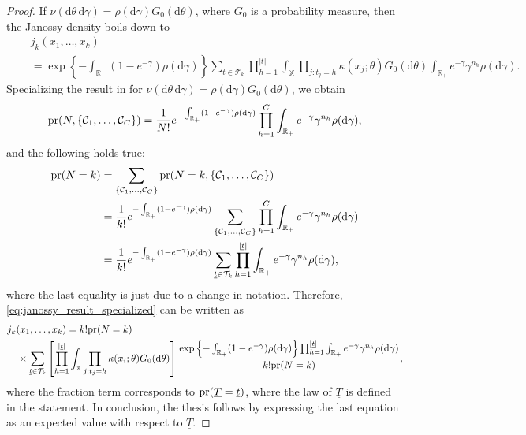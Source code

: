\documentclass[11pt,a4paper,oneside]{article}
\newcommand{\calC}{\mathcal{C}}
\newcommand{\calT}{\mathcal{T}}
\newcommand{\dd}{\mathrm d}
\newcommand{\X}{\mathbb{X}}
\newcommand{\R}{\mathbb{R}}
\newcommand{\prob}{{\rm pr}}
\theoremstyle{definition}
\theoremstyle{remark}
\begin{document}
\begin{proof}
If $\nu(\dd \theta\, \dd \gamma) = \rho(\dd \gamma) G_0(\dd \theta)$, where $G_0$ is a probability measure, then the Janossy density boils down to
\begin{equation}\label{eq:janossy_result_specialized}
\begin{split}
 & j_k(x_1,\ldots,x_k) \\
 \quad & = \exp\left\{ - \int_{\R_+} ( 1 - e^{-\gamma}) \rho(\dd \gamma) \right\} \sum_{\underline{t} \in \calT_k} \prod_{h=1}^{|\underline{t}|} \int_{\X} \prod_{j: t_j = h} \kappa(x_j ; \theta) G_0(\dd \theta) \int_{\R_+} e^{-\gamma} \gamma^{n_h} \rho(\dd \gamma).  
\end{split}
\end{equation}
Specializing the result in  for $\nu(\dd \theta\, \dd \gamma) = \rho(\dd \gamma) G_0(\dd \theta) $, we obtain
\[
\prob(N, \{\calC_1,\ldots, \calC_C\}) = \frac{1}{N!} e^{- \int_{\R_+}(1-e^{-\gamma}) \rho(\dd \gamma)} \prod_{h = 1}^C \int_{\R_+} e^{-\gamma} \gamma^{n_h} \rho(\dd \gamma), 
\]
and the following holds true:
\begin{equation*}
\begin{aligned}
    \prob(N = k) &= \sum_{\{\calC_1,\ldots,\calC_C\}} \prob(N = k, \{\calC_1,\ldots, \calC_C\})\\
    &= \frac{1}{k!} e^{- \int_{\R_+}(1-e^{-\gamma}) \rho(\dd \gamma)} \sum_{\{\calC_1,\ldots,\calC_C\}} \prod_{h = 1}^C \int_{\R_+} e^{-\gamma} \gamma^{n_h} \rho(\dd \gamma)\\
    &= \frac{1}{k!} e^{- \int_{\R_+}(1-e^{-\gamma}) \rho(\dd \gamma)} \sum_{\underline{t} \in \calT_k} \prod_{h = 1}^{|\underline{t}|} \int_{\R_+} e^{-\gamma} \gamma^{n_h} \rho(\dd \gamma),
\end{aligned}
\end{equation*}
where the last equality is just due to a change in notation. Therefore, \eqref{eq:janossy_result_specialized} can be written as
\begin{equation*}
\begin{aligned}
 &  j_k(x_1,\ldots,x_k) =  k!\prob(N=k) \\
    &\quad \times \sum_{\underline{t} \in \calT_k} \left[ \prod_{h=1}^{|\underline{t}|} \int_{\X} \prod_{j: t_j = h} \kappa(x_i ; \theta) G_0(\dd \theta)\right] \frac{\exp\left\{ - \int_{\R_+} ( 1 - e^{-\gamma}) \rho(\dd \gamma) \right\} \prod_{h=1}^{|\underline{t}|}  \int_{\R_+} e^{-\gamma} \gamma^{n_h} \rho(\dd \gamma)}{k!\prob(N=k)},  
\end{aligned}
\end{equation*}
where the fraction term corresponds to $\prob(\underline{T}= \underline{t})$, where the law of $\underline{T}$ is defined in the statement. In conclusion, the thesis follows by expressing the last equation as an expected value with respect to $\underline{T}$.
\end{proof}
\end{document}
